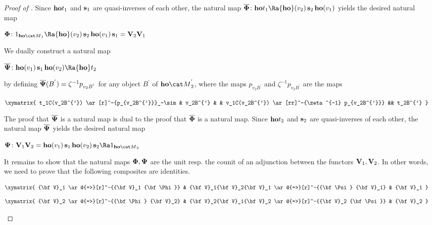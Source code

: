 \begin{proof}[Proof of ]
Since ${\bf ho}t_1$ and ${\bf s}_1$ are quasi-inverses of each other, the natural map $\overline{\bf \Phi} \colon {\bf ho}t_1 \Ra {\bf ho}(v_2) \, {\bf s}_2 \, {\bf ho}(v_1)$ yields the desired natural map 
\begin{center}
${\bf \Phi} \colon 1_{{\bf ho}{\cat M}_1} \Ra  {\bf ho}(v_2) \, {\bf s}_2 \, {\bf ho}(v_1) \, {\bf s}_1 = {\bf V}_2{\bf V}_1$
\end{center}

We dually construct a natural map
\begin{center}
$\overline{\bf \Psi} \colon {\bf ho}(v_1) \, {\bf s}_1 \, {\bf ho}(v_2) \Ra {\bf ho}t_2$ 
\end{center}
by defining $\overline{\bf \Psi} (B^{'}) = \zeta^{-1} p_{v_2B^{'}}$ for any object $B^{'}$ of ${\bf ho}{\cat M}^{'}_2$, where the maps $p_{v_2B^{'}}$ and $\zeta^{-1} p_{v_2B^{'}}$ are the maps
\begin{center}
$\xymatrix {
    t_1C(v_2B^{'}) \ar[r]^-{p_{v_2B^{'}}}_-\sim & v_2B^{'} &  & v_1C(v_2B^{'}) \ar[rr]^-{\zeta^{-1} p_{v_2B^{'}}} && t_2B^{'}
  }$
\end{center}
The proof that $\overline{\bf \Psi}$ is a natural map is dual to the proof that $\overline{\bf \Phi}$ is a natural map. Since ${\bf ho}t_2$ and ${\bf s}_2$ are quasi-inverses of each other, the natural map $\overline{\bf \Psi}$ yields the desired natural map 
\begin{center}
${\bf \Psi} \colon {\bf V}_1{\bf V}_2 = {\bf ho}(v_1) \, {\bf s}_1 \, {\bf ho}(v_2) \, {\bf s}_2 \Ra 1_{{\bf ho}{\cat M}_2} $
\end{center}

It remains to show that the natural maps ${\bf \Phi}, {\bf \Psi}$ are the unit resp. the counit of an adjunction between the functors ${\bf V}_1, {\bf V}_2$. In other words, we need to prove that the following composites are identities.
\begin{center}
\begin{equation}
\label{eqn:generaladj11}
\xymatrix {
    {\bf V}_1 \ar@{=>}[r]^-{{\bf V}_1 {\bf \Phi}} & {\bf V}_1{\bf V}_2{\bf V}_1 \ar@{=>}[r]^-{{\bf \Psi} {\bf V}_1} & {\bf V}_1
  }
\end{equation}
\begin{equation}
\label{eqn:generaladj12}
\xymatrix {
    {\bf V}_2 \ar@{=>}[r]^-{{\bf \Phi} {\bf V}_2} & {\bf V}_2{\bf V}_1{\bf V}_2 \ar@{=>}[r]^-{{\bf V}_2 {\bf \Psi}} & {\bf V}_2 
  }
\end{equation}
\end{center}


\end{proof}
